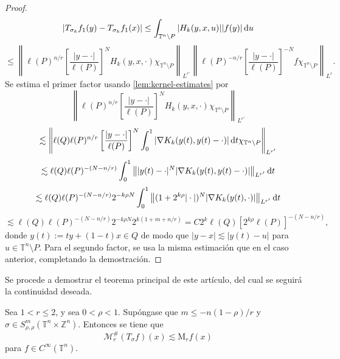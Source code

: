 \begin{proof}
\begin{equation*}
	|T_{\sigma_k}f_1(y) - T_{\sigma_k}f_1(x)| \leq \int_{\mathbb{T}^n\setminus P} |H_k(y, x, u)||f(y)|\mathop{}\!\mathrm{d} u
\end{equation*}
\begin{equation*}
	\leq \left\| \ell(P)^{n/r} \left[ \frac{|y-\cdot|}{\ell(P)}
	\right]^N H_k(y, x, \cdot) \chi_{\mathbb{T}^n\setminus P}
	\right\|_{L^{r'}} \left\| \ell(P)^{-n/r} \left[ \frac{|y-\cdot|}{\ell(P)}
	\right]^{-N} f\chi_{\mathbb{T}^n\setminus P}
	\right\|_{L^r}.
\end{equation*}
Se estima el primer factor usando \cref{lem:kernel-estimates} por
\begin{equation*}
	\left\| \ell(P)^{n/r} \left[ \frac{|y-\cdot|}{\ell(P)}
	\right]^N H_k(y, x, \cdot) \chi_{\mathbb{T}^n\setminus P}
	\right\|_{L^{r'}}
\end{equation*}
\begin{equation*}
	\lesssim \left\| \ell(Q)\ell(P)^{n/r} \left[ \frac{|y-\cdot|}{\ell(P)}
	\right]^N \int_0^1|\nabla K_k(y(t), y(t) - \cdot)|\mathop{}\!\mathrm{d} t \chi_{\mathbb{T}^n\setminus P}
	\right\|_{L^{r'}}
\end{equation*}
\begin{equation*}
	\lesssim \ell(Q)\ell(P)^{-(N-n/r)} \int_0^1\left\| |y(t) - \cdot|^N |\nabla K_k(y(t), y(t) - \cdot)|
	\right\|_{L^{r'}} \mathop{}\!\mathrm{d} t
\end{equation*}
\begin{equation*}
	\lesssim \ell(Q)\ell(P)^{-(N-n/r)} 2^{-k\rho N} \int_0^1 \left\| (1+2^{k\rho}|\cdot|)^N |\nabla K_k(y(t), \cdot)| 
	\right\|_{L^{r'}} \mathop{}\!\mathrm{d} t
\end{equation*}
\begin{equation*}
	\lesssim \ell(Q)\ell(P)^{-(N-n/r)} 2^{-k\rho N} 2^{k(1+m+n/r)} = C 2^k \ell(Q)[2^{k\rho}\ell(P)]^{-(N-n/r)},
\end{equation*}
donde $y(t) := ty + (1-t)x \in Q$ de modo que $|y-x|\lesssim|y(t)-u|$ para $u \in \mathbb{T}^n\setminus P$. Para el segundo factor, se usa la misma estimación que en el caso anterior, completando la demostración.
\end{proof}
Se procede a demostrar el teorema principal de este artículo, del cual se seguirá la continuidad deseada.
\begin{theorem}
Sea $1<r\leq 2$, y sea $0<\rho<1$. Supóngase que $m\leq-n(1-\rho)/r$ y $\sigma \in S^m_{\rho,\rho}(\mathbb{T}^n \times \mathbb{Z}^n)  $. Entonces se tiene que 
\begin{equation*}
	\mathcal{M}^\#_r(T_\sigma f)(x) \lesssim\mathrm{M}_r f(x)
\end{equation*}
para $f \in C^\infty(\mathbb{T}^n)$.
\label{theo:sharp-maximal}
\end{theorem}
